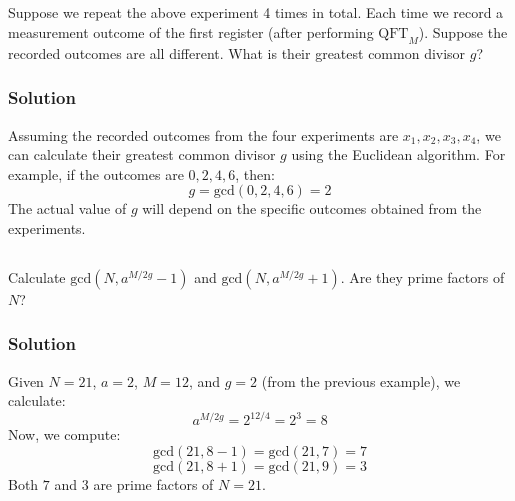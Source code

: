 \documentclass[12pt]{article} %
\begin{document}
\subsection{}
Suppose we repeat the above experiment 4 times in total. Each time we record a measurement outcome of the first register (after performing \(\text{QFT}_M\)). Suppose the recorded outcomes are all different. What is their greatest common divisor \(g\)?
\subsubsection*{Solution}
Assuming the recorded outcomes from the four experiments are \(x_1, x_2, x_3, x_4\), we can calculate their greatest common divisor \(g\) using the Euclidean algorithm. For example, if the outcomes are \(0, 2, 4, 6\), then:
\[g = \text{gcd}(0, 2, 4, 6) = 2\]
The actual value of \(g\) will depend on the specific outcomes obtained from the experiments.  

\subsection{}
Calculate \(\text{gcd}(N, a^{M/2g} - 1)\) and \(\text{gcd}(N, a^{M/2g} + 1)\). Are they prime factors of \(N\)?
\subsubsection*{Solution}
Given \(N = 21\), \(a = 2\), \(M = 12\), and \(g = 2\) (from the previous example), we calculate:
\[a^{M/2g} = 2^{12/4} = 2^3 = 8\]
Now, we compute:
\[\text{gcd}(21, 8 - 1) = \text{gcd}(21, 7) = 7\]
\[\text{gcd}(21, 8 + 1) = \text{gcd}(21, 9) = 3\]
Both \(7\) and \(3\) are prime factors of \(N = 21\).
\end{document}
